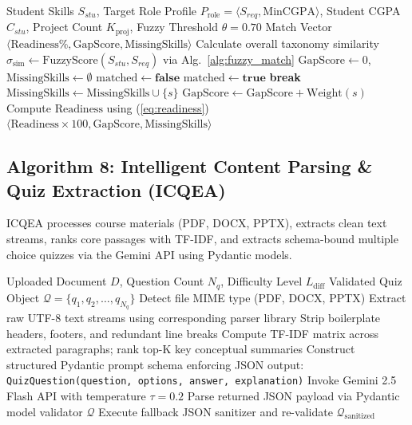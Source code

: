 \documentclass[conference]{IEEEtran}
\begin{document}
\begin{algorithm}[htbp]
\caption{Dynamic Skill Evaluation Algorithm (DSEA)}
\label{alg:dsea}
\begin{algorithmic}[1]
\REQUIRE Student Skills $S_{stu}$, Target Role Profile $P_{\text{role}} = \langle S_{req}, \text{MinCGPA} \rangle$, Student CGPA $C_{stu}$, Project Count $K_{\text{proj}}$, Fuzzy Threshold $\theta = 0.70$
\ENSURE Match Vector $\langle \text{Readiness\%}, \text{GapScore}, \text{MissingSkills} \rangle$
\STATE Calculate overall taxonomy similarity $\sigma_{\text{sim}} \leftarrow \text{FuzzyScore}(S_{stu}, S_{req})$ via Alg.~\ref{alg:fuzzy_match}
\STATE $\text{GapScore} \leftarrow 0$, $\text{MissingSkills} \leftarrow \emptyset$
    \STATE $\text{matched} \leftarrow \mathbf{false}$
            \STATE $\text{matched} \leftarrow \mathbf{true}$
            \STATE \textbf{break}
        \ENDIF
    \ENDFOR
        \STATE $\text{MissingSkills} \leftarrow \text{MissingSkills} \cup \{s\}$
        \STATE $\text{GapScore} \leftarrow \text{GapScore} + \text{Weight}(s)$
    \ENDIF
\ENDFOR
\STATE Compute $\text{Readiness}$ using (\ref{eq:readiness})
\RETURN $\langle \text{Readiness} \times 100, \text{GapScore}, \text{MissingSkills} \rangle$
\end{algorithmic}
\end{algorithm}

\subsection{Algorithm 8: Intelligent Content Parsing \& Quiz Extraction (ICQEA)}
ICQEA processes course materials (PDF, DOCX, PPTX), extracts clean text streams, ranks core passages with TF-IDF, and extracts schema-bound multiple choice quizzes via the Gemini API using Pydantic models.

\begin{algorithm}[htbp]
\caption{Intelligent Content Parsing \& Quiz Extraction (ICQEA)}
\label{alg:icqea}
\begin{algorithmic}[1]
\REQUIRE Uploaded Document $D$, Question Count $N_q$, Difficulty Level $L_{\text{diff}}$
\ENSURE Validated Quiz Object $\mathcal{Q} = \{ q_1, q_2, \dots, q_{N_q} \}$
\STATE Detect file MIME type (PDF, DOCX, PPTX)
\STATE Extract raw UTF-8 text streams using corresponding parser library
\STATE Strip boilerplate headers, footers, and redundant line breaks
\STATE Compute TF-IDF matrix across extracted paragraphs; rank top-K key conceptual summaries
\STATE Construct structured Pydantic prompt schema enforcing JSON output: \texttt{QuizQuestion(question, options, answer, explanation)}
\STATE Invoke Gemini 2.5 Flash API with temperature $\tau = 0.2$
\STATE Parse returned JSON payload via Pydantic model validator
    \RETURN $\mathcal{Q}$
\ELSE
    \STATE Execute fallback JSON sanitizer and re-validate
    \RETURN $\mathcal{Q}_{\text{sanitized}}$
\ENDIF
\end{algorithmic}
\end{algorithm}
\end{document}
